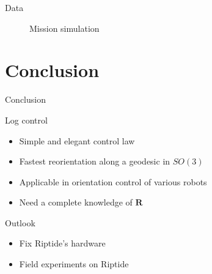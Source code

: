 \documentclass[10pt, xcolor={usenames, dvipsnames}]{beamer}
\begin{document}
\begin{frame}{Data}
\begin{figure}
                \caption{Mission simulation}
            \end{figure}
        \end{frame}

    \section{Conclusion}

        \begin{frame}{Conclusion}
            \centering
            \begin{minipage}{0.8\textwidth}
                \begin{block}{Log control}
                    \vspace*{.25cm}
                    \begin{itemize}
                        \item Simple and elegant control law
                        \item Fastest reorientation along a geodesic in $SO(3)$
                        \item Applicable in orientation control of various robots 
                        \item Need a complete knowledge of $\mathbf{R}$
                    \end{itemize}
                \end{block}
                \begin{block}{Outlook}
                    \begin{itemize}
                        \item Fix Riptide's hardware
                        \item Field experiments on Riptide
                    \end{itemize}
                \end{block}
            \end{minipage}
        \end{frame}
\end{document}

